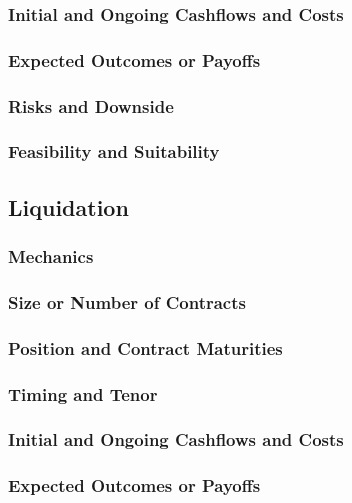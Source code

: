\documentclass[11pt, a4paper, british]{article}
\begin{document}
\subsubsection{Initial and Ongoing Cashflows and Costs}

\subsubsection{Expected Outcomes or Payoffs}

\subsubsection{Risks and Downside}

\subsubsection{Feasibility and Suitability}

\newpage

\subsection{Liquidation}

\subsubsection{Mechanics}

\subsubsection{Size or Number of Contracts}

\subsubsection{Position and Contract Maturities}

\subsubsection{Timing and Tenor}

\subsubsection{Initial and Ongoing Cashflows and Costs}

\subsubsection{Expected Outcomes or Payoffs}
\end{document}
